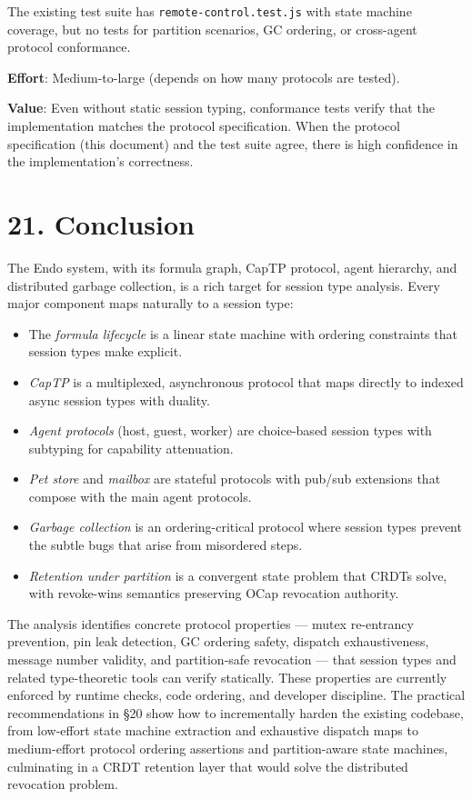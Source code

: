 \documentclass[11pt]{article}
\begin{document}
The existing test suite has \texttt{remote-control.test.js} with state machine
coverage, but no tests for partition scenarios, GC ordering, or
cross-agent protocol conformance.

\textbf{Effort}: Medium-to-large (depends on how many protocols are tested).

\textbf{Value}: Even without static session typing, conformance tests verify that
the implementation matches the protocol specification. When the protocol
specification (this document) and the test suite agree, there is high
confidence in the implementation's correctness.
\section{21. Conclusion}
\label{sec:orgf81b30b}

The Endo system, with its formula graph, CapTP protocol, agent hierarchy,
and distributed garbage collection, is a rich target for session type
analysis. Every major component maps naturally to a session type:

\begin{itemize}
\item The \emph{formula lifecycle} is a linear state machine with ordering
constraints that session types make explicit.
\item \emph{CapTP} is a multiplexed, asynchronous protocol that maps directly to
indexed async session types with duality.
\item \emph{Agent protocols} (host, guest, worker) are choice-based session types
with subtyping for capability attenuation.
\item \emph{Pet store} and \emph{mailbox} are stateful protocols with pub/sub extensions
that compose with the main agent protocols.
\item \emph{Garbage collection} is an ordering-critical protocol where session types
prevent the subtle bugs that arise from misordered steps.
\item \emph{Retention under partition} is a convergent state problem that CRDTs solve,
with revoke-wins semantics preserving OCap revocation authority.
\end{itemize}

The analysis identifies concrete protocol properties --- mutex re-entrancy
prevention, pin leak detection, GC ordering safety, dispatch exhaustiveness,
message number validity, and partition-safe revocation --- that session types
and related type-theoretic tools can verify statically. These properties are
currently enforced by runtime checks, code ordering, and developer
discipline. The practical recommendations in §20 show how to incrementally
harden the existing codebase, from low-effort state machine extraction and
exhaustive dispatch maps to medium-effort protocol ordering assertions and
partition-aware state machines, culminating in a CRDT retention layer that
would solve the distributed revocation problem.
\end{document}
